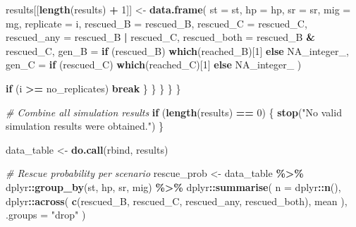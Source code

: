 \documentclass[
]{article}
\newenvironment{Shaded}{\begin{snugshade}}{\end{snugshade}}
\newcommand{\AttributeTok}[1]{\textcolor[rgb]{0.13,0.29,0.53}{#1}}
\newcommand{\CommentTok}[1]{\textcolor[rgb]{0.56,0.35,0.01}{\textit{#1}}}
\newcommand{\ConstantTok}[1]{\textcolor[rgb]{0.56,0.35,0.01}{#1}}
\newcommand{\ControlFlowTok}[1]{\textcolor[rgb]{0.13,0.29,0.53}{\textbf{#1}}}
\newcommand{\DecValTok}[1]{\textcolor[rgb]{0.00,0.00,0.81}{#1}}
\newcommand{\FunctionTok}[1]{\textcolor[rgb]{0.13,0.29,0.53}{\textbf{#1}}}
\newcommand{\NormalTok}[1]{#1}
\newcommand{\OtherTok}[1]{\textcolor[rgb]{0.56,0.35,0.01}{#1}}
\newcommand{\SpecialCharTok}[1]{\textcolor[rgb]{0.81,0.36,0.00}{\textbf{#1}}}
\newcommand{\StringTok}[1]{\textcolor[rgb]{0.31,0.60,0.02}{#1}}
\begin{document}
\begin{Shaded}
\begin{Highlighting}[]
\NormalTok{          results[[}\FunctionTok{length}\NormalTok{(results) }\SpecialCharTok{+} \DecValTok{1}\NormalTok{]] }\OtherTok{\textless{}{-}} \FunctionTok{data.frame}\NormalTok{(}
            \AttributeTok{st =}\NormalTok{ st,}
            \AttributeTok{hp =}\NormalTok{ hp,}
            \AttributeTok{sr =}\NormalTok{ sr,}
            \AttributeTok{mig =}\NormalTok{ mg,}
            \AttributeTok{replicate =}\NormalTok{ i,}
            \AttributeTok{rescued\_B =}\NormalTok{ rescued\_B,}
            \AttributeTok{rescued\_C =}\NormalTok{ rescued\_C,}
            \AttributeTok{rescued\_any =}\NormalTok{ rescued\_B }\SpecialCharTok{|}\NormalTok{ rescued\_C,}
            \AttributeTok{rescued\_both =}\NormalTok{ rescued\_B }\SpecialCharTok{\&}\NormalTok{ rescued\_C,}
            \AttributeTok{gen\_B =} \ControlFlowTok{if}\NormalTok{ (rescued\_B) }\FunctionTok{which}\NormalTok{(reached\_B)[}\DecValTok{1}\NormalTok{] }\ControlFlowTok{else} \ConstantTok{NA\_integer\_}\NormalTok{,}
            \AttributeTok{gen\_C =} \ControlFlowTok{if}\NormalTok{ (rescued\_C) }\FunctionTok{which}\NormalTok{(reached\_C)[}\DecValTok{1}\NormalTok{] }\ControlFlowTok{else} \ConstantTok{NA\_integer\_}
\NormalTok{          )}
          
          \ControlFlowTok{if}\NormalTok{ (i }\SpecialCharTok{\textgreater{}=}\NormalTok{ no\_replicates) }\ControlFlowTok{break}
\NormalTok{         \}}
\NormalTok{        \}}
\NormalTok{      \}}
\NormalTok{    \}}
\NormalTok{  \}}
  
  \CommentTok{\# Combine all simulation results}
  \ControlFlowTok{if}\NormalTok{ (}\FunctionTok{length}\NormalTok{(results) }\SpecialCharTok{==} \DecValTok{0}\NormalTok{) \{}
    \FunctionTok{stop}\NormalTok{(}\StringTok{"No valid simulation results were obtained."}\NormalTok{)}
\NormalTok{  \}}
  
\NormalTok{  data\_table }\OtherTok{\textless{}{-}} \FunctionTok{do.call}\NormalTok{(rbind, results)}

  \CommentTok{\# Rescue probability per scenario}
\NormalTok{  rescue\_prob }\OtherTok{\textless{}{-}}\NormalTok{ data\_table }\SpecialCharTok{\%\textgreater{}\%}
\NormalTok{    dplyr}\SpecialCharTok{::}\FunctionTok{group\_by}\NormalTok{(st, hp, sr, mig) }\SpecialCharTok{\%\textgreater{}\%}
\NormalTok{    dplyr}\SpecialCharTok{::}\FunctionTok{summarise}\NormalTok{(}
      \AttributeTok{n =}\NormalTok{ dplyr}\SpecialCharTok{::}\FunctionTok{n}\NormalTok{(),}
\NormalTok{      dplyr}\SpecialCharTok{::}\FunctionTok{across}\NormalTok{(}
        \FunctionTok{c}\NormalTok{(rescued\_B, rescued\_C, rescued\_any, rescued\_both),}
\NormalTok{        mean}
\NormalTok{      ),}
      \AttributeTok{.groups =} \StringTok{"drop"}
\NormalTok{    )}
  

\end{Highlighting}
\end{Shaded}
\end{document}
